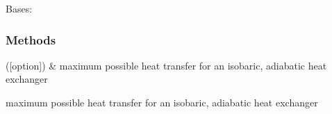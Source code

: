 \documentclass[letterpaper,10pt,english]{sphinxmanual}
\begin{document}
\begin{fulllineitems}
\label{\detokenize{heat_exchanger:heat_exchanger.heat_exchanger}}
\pysigstartsignatures
{}
\pysigstopsignatures
\sphinxAtStartPar
Bases: 
\subsubsection*{Methods}


\begin{savenotes}\sphinxattablestart
\sphinxthistablewithglobalstyle
\sphinxthistablewithnovlinesstyle
\centering
\begin{tabulary}{\linewidth}[t]{}
\sphinxtoprule
\sphinxtableatstartofbodyhook
\sphinxAtStartPar
{\hyperref[\detokenize{heat_exchanger:heat_exchanger.heat_exchanger.q_max}]{}}({[}option{]})
&
\sphinxAtStartPar
maximum possible heat transfer for an isobaric, adiabatic heat exchanger
\\
\sphinxbottomrule
\end{tabulary}
\sphinxtableafterendhook\par
\sphinxattableend\end{savenotes}

\begin{fulllineitems}
\label{\detokenize{heat_exchanger:heat_exchanger.heat_exchanger.q_max}}
\pysigstartsignatures
{}
\pysigstopsignatures
\sphinxAtStartPar
maximum possible heat transfer for an isobaric, adiabatic
heat exchanger

\end{fulllineitems}


\end{fulllineitems}
\end{document}
